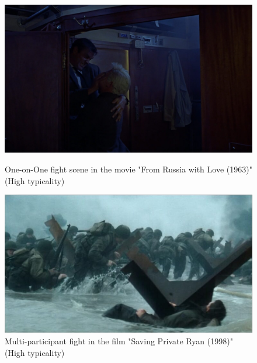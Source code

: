 \documentclass[12pt]{report}
\begin{document}
	\begin{figure}[h]
		\centering
		\begin{minipage}{0.45\linewidth}
			\centering
			\includegraphics[width=\linewidth]{From-Russia-with-Love-1963.jpg}
			\caption{One-on-One fight scene in the movie "From Russia with Love (1963)" (High typicality) \cite{tico-romao-2024}}
			\label{fig:bond}
		\end{minipage}
		\hspace{0.05\linewidth}  %
		\begin{minipage}{0.45\linewidth}
			\centering
			\includegraphics[width=\linewidth]{Saving-Private-Ryan-1998.jpg}
			\caption{Multi-participant fight in the film "Saving Private Ryan (1998)" (High typicality)\cite{tico-romao-2024}}
			\label{fig:saving_private_ryan}
		\end{minipage}
	\end{figure}
	
\end{document}
